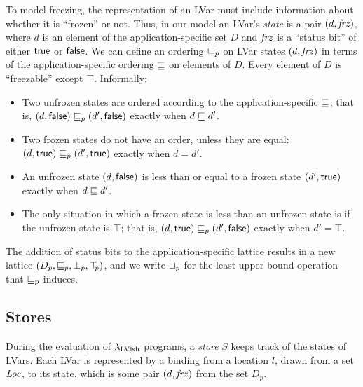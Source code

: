 \documentclass{article}
\begin{document}
To model freezing, the representation of an LVar must include
information about whether it is ``frozen'' or not.  Thus, in our model
an LVar's \emph{state} is a pair $(d, \mathit{frz})$, where $d$ is an
element of the application-specific set $D$ and $\mathit{frz}$ is a
``status bit'' of either $\textsf{true}$ or $\textsf{false}$.  We can
define an ordering $\sqsubseteq_p$ on LVar states $(d, \mathit{frz})$ in
terms of the application-specific ordering $\sqsubseteq$ on elements of
$D$.  Every element of $D$ is ``freezable'' except $\top$.
Informally:
\begin{itemize}
\item Two unfrozen states are ordered according to the
  application-specific $\sqsubseteq$; that is, $(d, \textsf{false})
  \sqsubseteq_p (d', \textsf{false})$ exactly when $d \sqsubseteq d'$.
\item Two frozen states do not have an order, unless they are equal:
  $(d, \textsf{true}) \sqsubseteq_p (d', \textsf{true})$ exactly when
  $d = d'$.
\item An unfrozen state $(d, \textsf{false})$ is less than or
  equal to a frozen state $(d', \textsf{true})$ exactly when $d
  \sqsubseteq d'$.
\item The only situation in which a frozen state is less than an
  unfrozen state is if the unfrozen state is $\top$; that is,
  $(d, \textsf{true}) \sqsubseteq_p (d', \textsf{false})$ exactly when
  $d' = \top$.
\end{itemize}
The addition of status bits to the application-specific lattice
results in a new lattice $(D_p, \sqsubseteq_p, \bot_{p}, \top\hspace{-0.85mm}_{p})$, and we write
$ \sqcup_p $ for the least upper bound operation that $\sqsubseteq_p$ induces.

\subsection{Stores}

During the evaluation of $\lambda_{\textrm{LVish}}$ programs, a \emph{store} $S$
keeps track of the states of LVars.  Each LVar is represented by a
binding from a location $l$, drawn from a set $\mathit{Loc}$, to its state,
which is some pair $(d, \mathit{frz})$ from the set $D_p$.
\end{document}
